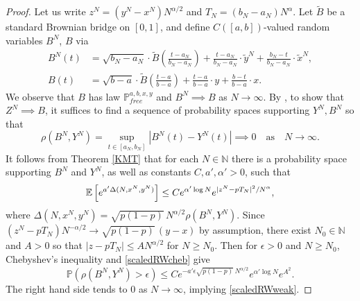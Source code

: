 \begin{proof}
	Let us write $z^N = (y^N-x^N)N^{\alpha/2}$ and $T_N = (b_N-a_N)N^\alpha$. Let $\tilde{B}$ be a standard Brownian bridge on $[0,1]$, and define $C([a,b])$-valued random variables $B^N$, $B$ via
	\begin{align*}
	B^N(t) &= \sqrt{b_N-a_N}\cdot\tilde{B}\left(\frac{t-a_N}{b_N-a_N}\right) + \frac{t-a_N}{b_N-a_N}\cdot \tilde{y}^N + \frac{b_N-t}{b_N-a_N}\cdot \tilde{x}^N,\\
	B(t) &= \sqrt{b-a}\cdot \tilde{B}\left(\frac{t-a}{b-a}\right) + \frac{t-a}{b-a}\cdot y + \frac{b-t}{b-a}\cdot x.
	\end{align*}
	We observe that $B$ has law $\mathbb{P}^{a,b,x,y}_{free}$ and $B^N\implies B$ as $N\to\infty$. By \cite[Theorem 3.1]{Billing}, to show that $Z^N\implies B$, it suffices to find a sequence of probability spaces supporting $Y^N,B^N$ so that
	\begin{equation}\label{scaledRWweak}
	\rho(B^N,Y^N) = \sup_{t\in[a_N,b_N]} |B^N(t) - Y^N(t)| \implies 0 \quad \mathrm{as} \quad N\to\infty.
	\end{equation}
	It follows from Theorem \ref{KMT} that for each $N\in\mathbb{N}$ there is a probability space supporting $B^N$ and $Y^N$, as well as constants $C,a',\alpha' > 0$, such that
	\begin{equation}\label{scaledRWcheb}
	\mathbb{E}\left[e^{a'\Delta(N,x^N,y^N)}\right] \leq Ce^{\alpha'\log N} e^{|z^N-pT_N|^2/N^\alpha},
	\end{equation}
	where $\Delta(N,x^N,y^N) = \sqrt{p(1-p)}\,N^{\alpha/2}\rho(B^N,Y^N)$. Since $(z^N - pT_N)N^{-\alpha/2} \to \sqrt{p(1-p)}\,(y-x)$ by assumption, there exist $N_0\in\mathbb{N}$ and $A>0$ so that $|z-pT_N| \leq AN^{\alpha/2}$ for $N\geq N_0$. Then for $\epsilon > 0$ and $N\geq N_0$, Chebyshev's inequality and \eqref{scaledRWcheb} give
	\[
	\mathbb{P}(\rho(B^N,Y^N) > \epsilon) \leq C e^{-a'\epsilon\sqrt{p(1-p)}\, N^{\alpha/2}}e^{\alpha'\log N} e^{A^2}.
	\]
	The right hand side tends to 0 as $N\to\infty$, implying \eqref{scaledRWweak}.
\end{proof}

